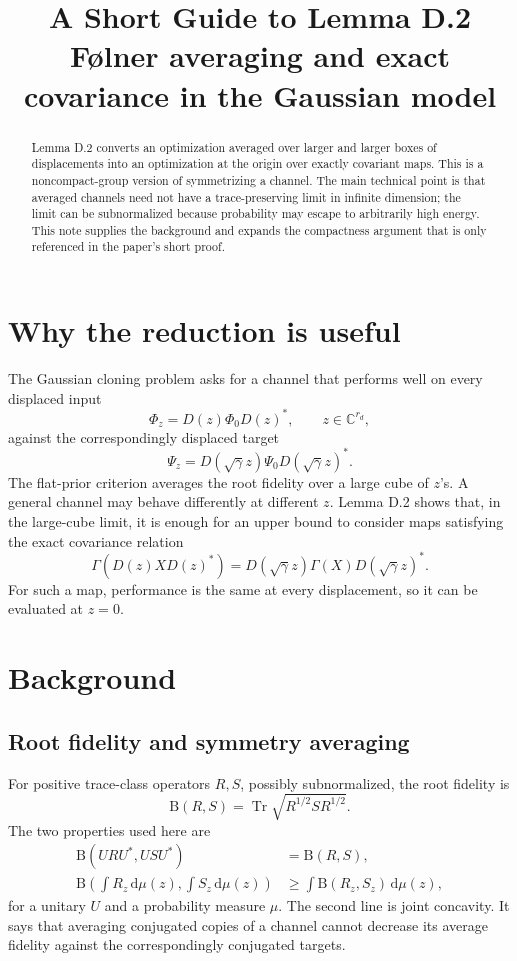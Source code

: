 \documentclass[11pt]{article}
\title{A Short Guide to Lemma D.2\\
\large F\o lner averaging and exact covariance in the Gaussian model}
\author{}
\date{}
\newcommand{\C}{\mathbb C}
\newcommand{\Tr}{\operatorname{Tr}}
\newcommand{\dd}{\,\mathrm d}
\newcommand{\B}{\mathrm B}
\begin{document}
\maketitle

\begin{abstract}
Lemma D.2 converts an optimization averaged over larger and larger boxes of
displacements into an optimization at the origin over exactly covariant
maps.  This is a noncompact-group version of symmetrizing a channel.  The
main technical point is that averaged channels need not have a
trace-preserving limit in infinite dimension; the limit can be
subnormalized because probability may escape to arbitrarily high energy.
This note supplies the background and expands the compactness argument that
is only referenced in the paper's short proof.
\end{abstract}

\section{Why the reduction is useful}

The Gaussian cloning problem asks for a channel that performs well on every
displaced input
\[
  \Phi_z=D(z)\Phi_0D(z)^*,\qquad z\in\C^{r_d},
\]
against the correspondingly displaced target
\[
  \Psi_z=D(\sqrt\gamma z)\Psi_0D(\sqrt\gamma z)^*.
\]
The flat-prior criterion averages the root fidelity over a large cube of
$z$'s.  A general channel may behave differently at different $z$.  Lemma
D.2 shows that, in the large-cube limit, it is enough for an upper bound to
consider maps satisfying the exact covariance relation
\[
  \Gamma(D(z)XD(z)^*)
  =D(\sqrt\gamma z)\Gamma(X)D(\sqrt\gamma z)^*.
\]
For such a map, performance is the same at every displacement, so it can be
evaluated at $z=0$.

\section{Background}

\subsection{Root fidelity and symmetry averaging}

For positive trace-class operators $R,S$, possibly subnormalized, the root
fidelity is
\[
  \B(R,S)=\Tr\sqrt{R^{1/2}SR^{1/2}}.
\]
The two properties used here are
\begin{align*}
  \B(URU^*,USU^*)&=\B(R,S),\\
  \B\left(\int R_z\dd\mu(z),\int S_z\dd\mu(z)\right)
  &\geq\int\B(R_z,S_z)\dd\mu(z),
\end{align*}
for a unitary $U$ and a probability measure $\mu$.  The second line is joint
concavity.  It says that averaging conjugated copies of a channel cannot
decrease its average fidelity against the correspondingly conjugated
targets.
\end{document}
